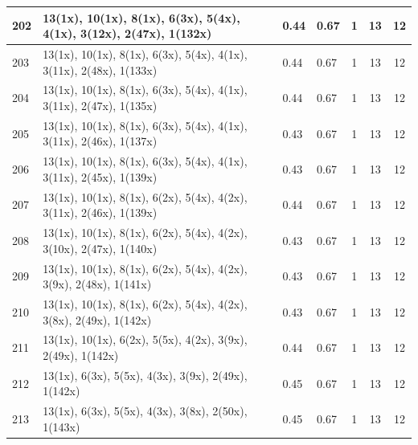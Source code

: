 \begin{small}
\begin{longtable}{|p{0.5cm}|p{9cm}|p{1.3cm}|p{1.3cm}|c|c|c|}
  202 & 13(1x), 10(1x), 8(1x), 6(3x), 5(4x), 4(1x), 3(12x), 2(47x), 1(132x) & \cellcolor{colorGood}  0.44 & \cellcolor{colorGood} 0.67 & 1 & 13 & \cellcolor{colorGood} 12 \\   \hline
  203 & 13(1x), 10(1x), 8(1x), 6(3x), 5(4x), 4(1x), 3(11x), 2(48x), 1(133x) & \cellcolor{colorGood}  0.44 & \cellcolor{colorGood} 0.67 & 1 & 13 & \cellcolor{colorGood} 12 \\   \hline
  204 & 13(1x), 10(1x), 8(1x), 6(3x), 5(4x), 4(1x), 3(11x), 2(47x), 1(135x) & \cellcolor{colorGood}  0.44 & \cellcolor{colorGood} 0.67 & 1 & 13 & \cellcolor{colorGood} 12 \\   \hline
  205 & 13(1x), 10(1x), 8(1x), 6(3x), 5(4x), 4(1x), 3(11x), 2(46x), 1(137x) & \cellcolor{colorGood}  0.43 & \cellcolor{colorGood} 0.67 & 1 & 13 & \cellcolor{colorGood} 12 \\   \hline
  206 & 13(1x), 10(1x), 8(1x), 6(3x), 5(4x), 4(1x), 3(11x), 2(45x), 1(139x) & \cellcolor{colorGood}  0.43 & \cellcolor{colorGood} 0.67 & 1 & 13 & \cellcolor{colorGood} 12 \\   \hline
  207 & 13(1x), 10(1x), 8(1x), 6(2x), 5(4x), 4(2x), 3(11x), 2(46x), 1(139x) & \cellcolor{colorGood}  0.44 & \cellcolor{colorGood} 0.67 & 1 & 13 & \cellcolor{colorGood} 12 \\   \hline
  208 & 13(1x), 10(1x), 8(1x), 6(2x), 5(4x), 4(2x), 3(10x), 2(47x), 1(140x) & \cellcolor{colorGood}  0.43 & \cellcolor{colorGood} 0.67 & 1 & 13 & \cellcolor{colorGood} 12 \\   \hline
  209 & 13(1x), 10(1x), 8(1x), 6(2x), 5(4x), 4(2x), 3(9x), 2(48x), 1(141x) & \cellcolor{colorGood}  0.43 & \cellcolor{colorGood} 0.67 & 1 & 13 & \cellcolor{colorGood} 12 \\   \hline
  210 & 13(1x), 10(1x), 8(1x), 6(2x), 5(4x), 4(2x), 3(8x), 2(49x), 1(142x) & \cellcolor{colorGood}  0.43 & \cellcolor{colorGood} 0.67 & 1 & 13 & \cellcolor{colorGood} 12 \\   \hline
  211 & 13(1x), 10(1x), 6(2x), 5(5x), 4(2x), 3(9x), 2(49x), 1(142x) & \cellcolor{colorGood}  0.44 & \cellcolor{colorGood} 0.67 & 1 & 13 & \cellcolor{colorGood} 12 \\   \hline
  212 & 13(1x), 6(3x), 5(5x), 4(3x), 3(9x), 2(49x), 1(142x) & \cellcolor{colorGood}  0.45 & \cellcolor{colorGood} 0.67 & 1 & 13 & \cellcolor{colorGood} 12 \\   \hline
  213 & 13(1x), 6(3x), 5(5x), 4(3x), 3(8x), 2(50x), 1(143x) & \cellcolor{colorGood}  0.45 & \cellcolor{colorGood} 0.67 & 1 & 13 & \cellcolor{colorGood} 12 \\   \hline

\end{longtable}
\end{small}
